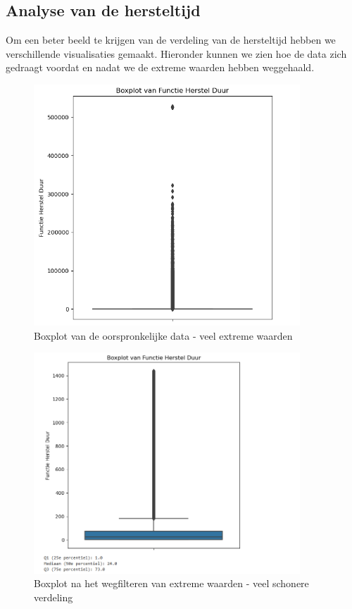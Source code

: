 \documentclass{article}
\begin{document}
\subsection{Analyse van de hersteltijd}
Om een beter beeld te krijgen van de verdeling van de hersteltijd hebben we verschillende visualisaties gemaakt. Hieronder kunnen we zien hoe de data zich gedraagt voordat en nadat we de extreme waarden hebben weggehaald.

\begin{figure}[H]
    \centering
    \includegraphics[width=10cm]{boxplot_FH_duur.png}
    \caption{Boxplot van de oorspronkelijke data - veel extreme waarden}
\end{figure}

\begin{figure}[H]
    \centering
    \includegraphics[width=10cm]{boxplot_target.png}
    \caption{Boxplot na het wegfilteren van extreme waarden - veel schonere verdeling}
\end{figure}
\end{document}
